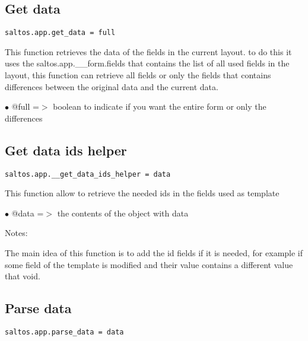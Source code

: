 \documentclass[a4paper]{book}
\begin{document}
\hypertarget{toc416}{}
\subsection{Get data}

\begin{lstlisting}
saltos.app.get_data = full
\end{lstlisting}

This function retrieves the data of the fields in the current layout. to do this it uses
the saltos.app.\_\_form.fields that contains the list of all used fields in the layout, this
function can retrieve all fields or only the fields that contains differences between the
original data and the current data.

\begin{compactitem}
\item[\color{myblue}$\bullet$] @full =$>$ boolean to indicate if you want the entire form or only the differences
\end{compactitem}

\hypertarget{toc417}{}
\subsection{Get data ids helper}

\begin{lstlisting}
saltos.app.__get_data_ids_helper = data
\end{lstlisting}

This function allow to retrieve the needed ids in the fields used as template

\begin{compactitem}
\item[\color{myblue}$\bullet$] @data =$>$ the contents of the object with data
\end{compactitem}

Notes:

The main idea of this function is to add the id fields if it is needed, for example
if some field of the template is modified and their value contains a different value
that void.

\hypertarget{toc418}{}
\subsection{Parse data}

\begin{lstlisting}
saltos.app.parse_data = data
\end{lstlisting}
\end{document}
